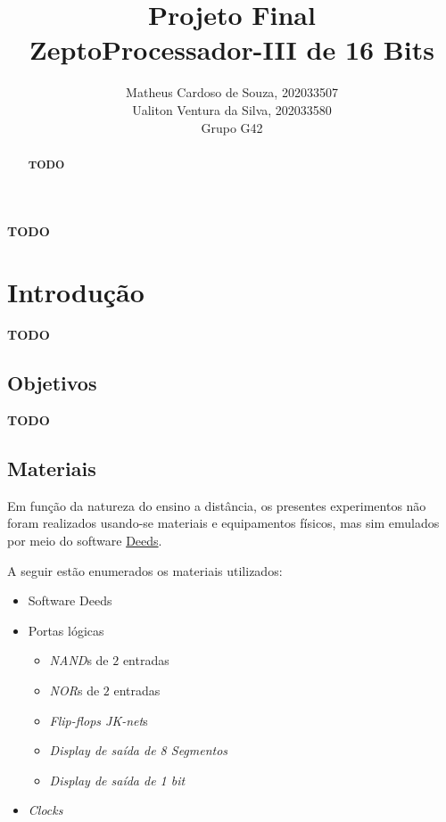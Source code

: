 \documentclass[12pt]{article}
\title{Projeto Final\\
ZeptoProcessador-III de 16 Bits}
\author{Matheus Cardoso de Souza, 202033507\\
        Ualiton Ventura da Silva, 202033580\\
        Grupo G42
}
\begin{document}
\maketitle

 \begin{abstract}
   \textbf{TODO}
 \end{abstract}

 \begin{resumo}
   \textbf{TODO}
 \end{resumo}


\section{Introdução}\label{sec:Introducao}

\textbf{TODO}

\subsection{Objetivos}\label{sec:Objetivos}

\textbf{TODO}

\subsection{Materiais}\label{sec:Materiais}

Em função da natureza do ensino a distância, os presentes experimentos não foram
realizados usando-se materiais e equipamentos físicos, mas sim emulados por meio
do software
\href{https://www.digitalelectronicsdeeds.com/downloads.html}{Deeds}.

A seguir estão enumerados os materiais utilizados:
\begin{itemize}
    \item Software Deeds
    \item Portas lógicas
    \begin{itemize}
      \item \emph{NAND}s de $2$ entradas
      \item \emph{NOR}s de $2$ entradas
      \item \emph{Flip-flops JK-net}s
      \item \emph{Display de saída de 8 Segmentos}
      \item \emph{Display de saída de 1 bit}
    \end{itemize}
    \item \emph{Clocks}
\end{itemize}
\end{document}
